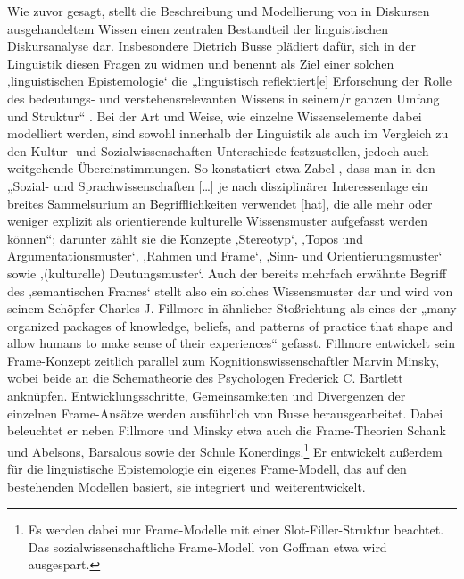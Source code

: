 Wie zuvor gesagt, stellt die Beschreibung und Modellierung von in Diskursen ausgehandeltem Wissen einen zentralen Bestandteil der linguistischen Diskursanalyse dar. Insbesondere Dietrich Busse plädiert dafür, sich in der Linguistik diesen Fragen zu widmen und benennt als Ziel einer solchen ‚linguistischen Epistemologie` die „linguistisch reflektiert{[}e{]} Erforschung der Rolle des bedeutungs- und verstehensrelevanten Wissens in seinem/r ganzen Umfang und Struktur`` \autocite*[190-191]{busseSprachverstehenUndTextinterpretation2015}. Bei der Art und Weise, wie einzelne Wissenselemente dabei modelliert werden, sind sowohl innerhalb der Linguistik als auch im Vergleich zu den Kultur- und Sozialwissenschaften Unterschiede festzustellen, jedoch auch weitgehende Übereinstimmungen. So konstatiert etwa Zabel \autocite*[66]{zabelSpracheKulturWiderstand2015}, dass man in den „Sozial- und Sprachwissenschaften {[}\ldots{]} je nach disziplinärer Interessenlage ein breites Sammelsurium an Begrifflichkeiten verwendet {[}hat{]}, die alle mehr oder weniger explizit als orientierende kulturelle Wissensmuster aufgefasst werden können``; darunter zählt sie die Konzepte ‚Stereotyp`, ‚Topos und Argumentationsmuster`, ‚Rahmen und Frame`, ‚Sinn- und Orientierungsmuster` sowie ‚(kulturelle) Deutungsmuster`. Auch der bereits mehrfach erwähnte Begriff des ‚semantischen Frames` stellt also ein solches Wissensmuster dar und wird von seinem Schöpfer Charles J. Fillmore in ähnlicher Stoßrichtung als eines der „many organized packages of knowledge, beliefs, and patterns of practice that shape and allow humans to make sense of their experiences`` \autocite[314]{fillmoreFramesApproachSemantic2010} gefasst. Fillmore entwickelt sein Frame-Konzept zeitlich parallel zum Kognitionswissenschaftler Marvin Minsky, wobei beide an die Schematheorie des Psychologen Frederick C. Bartlett anknüpfen. Entwicklungsschritte, Gemeinsamkeiten und Divergenzen der einzelnen Frame-Ansätze werden ausführlich von Busse \autocite*{busseFrameSemantikKompendium2012} herausgearbeitet. Dabei beleuchtet er neben Fillmore und Minsky etwa auch die Frame-Theorien Schank und Abelsons, Barsalous sowie der Schule Konerdings.\footnote{Es werden dabei nur Frame-Modelle mit einer Slot-Filler-Struktur beachtet. Das sozialwissenschaftliche Frame-Modell von Goffman \autocite*{goffmanFrameAnalysisEssay1974} etwa wird ausgespart.} Er entwickelt außerdem für die linguistische Epistemologie ein eigenes Frame-Modell, das auf den bestehenden Modellen basiert, sie integriert und weiterentwickelt.

